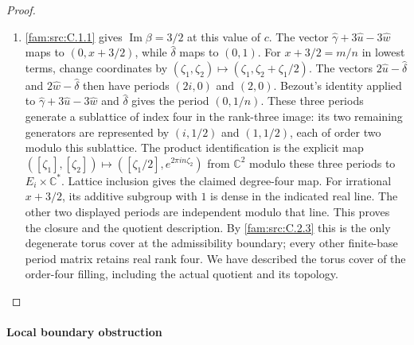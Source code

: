 \begin{proof}
\begin{enumerate}[label=\arabic*.,leftmargin=*]
\item \ref{fam:src:C.1.1} gives \(\operatorname{Im}\beta=3/2\) at this value of \(c\).
The vector \(\widehat\gamma+3\widehat u-3\widehat w\) maps to
\((0,x+3/2)\), while \(\widehat\delta\) maps to \((0,1)\).
For $x+3/2=m/n$ in lowest terms, change coordinates by
$(\zeta_1,\zeta_2)\mapsto(\zeta_1,\zeta_2+\zeta_1/2)$.
The vectors $2\widehat u-\widehat\delta$ and
$2\widehat w-\widehat\delta$ then have periods $(2i,0)$ and $(2,0)$.
Bezout's identity applied to $\widehat\gamma+3\widehat u-3\widehat w$
and $\widehat\delta$ gives the period $(0,1/n)$.
These three periods generate a sublattice of index four in the rank-three
image: its two remaining generators are represented by
$(i,1/2)$ and $(1,1/2)$, each of order two modulo this sublattice.
The product identification is the explicit map
$([\zeta_1],[\zeta_2])\mapsto([\zeta_1/2],e^{2\pi in\zeta_2})$
from $\mathbb C^2$ modulo these three periods to $E_i\times\mathbb C^*$. Lattice inclusion gives the claimed degree-four map.
For irrational $x+3/2$, its additive subgroup with $1$ is dense in the
indicated real line. The other two displayed periods are independent
modulo that line. This proves the closure and the quotient description.
By \ref{fam:src:C.2.3} this is the only degenerate torus cover at the admissibility
boundary; every other finite-base period matrix retains real rank four.
We have described the torus cover of the order-four filling, including
the actual quotient and its topology.
\end{enumerate}
\end{proof}


\paragraph{Local boundary obstruction}\hypertarget{tag-01QO}{}\label{fam:src:C.3.3}\label{fam:st:C.3.3}

